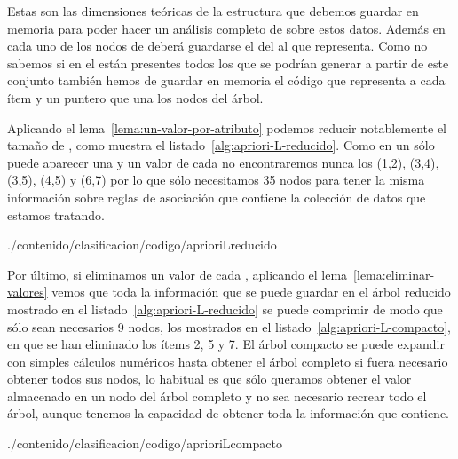 Estas son las dimensiones teóricas de la estructura que debemos guardar en memoria para poder hacer un análisis completo de \ARM sobre estos datos. Además en cada uno de los nodos de \aprioriL deberá guardarse el \soporte del \itemset al que representa. Como no sabemos si en el \dataset están presentes todos los \itemsets que se podrían generar a partir de este conjunto \I también hemos de guardar en memoria el código que representa a cada ítem y un puntero que una los nodos del árbol.

Aplicando el lema~\ref{lema:un-valor-por-atributo} podemos reducir notablemente el tamaño de \aprioriL, como muestra el listado~\ref{alg:apriori-L-reducido}. Como en un \registro sólo puede aparecer una \clase y un valor de cada \atributo no encontraremos nunca los \itemsets (1,2), (3,4), (3,5), (4,5) y (6,7) por lo que sólo necesitamos 35 nodos para tener la misma información sobre reglas de asociación que contiene la colección de datos que estamos tratando. 


                 {./contenido/clasificacion/codigo/aprioriLreducido}

Por último, si eliminamos un valor de cada \atributo, aplicando el lema~\ref{lema:eliminar-valores} vemos que toda la información que se puede guardar en el árbol \aprioriL reducido mostrado en el listado~\ref{alg:apriori-L-reducido} se puede comprimir de modo que sólo sean necesarios 9 nodos, los mostrados en el listado~\ref{alg:apriori-L-compacto}, en que se han eliminado los ítems 2, 5 y 7. El árbol \aprioriL compacto se puede expandir con simples cálculos numéricos hasta obtener el árbol \aprioriL completo si fuera necesario obtener todos sus nodos, lo habitual es que sólo queramos obtener el valor almacenado en un nodo del árbol \aprioriL completo y no sea necesario recrear todo el árbol, aunque tenemos la capacidad de obtener toda la información que contiene.


                 {./contenido/clasificacion/codigo/aprioriLcompacto}

